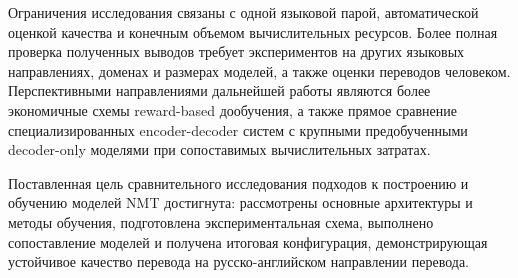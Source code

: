 Ограничения исследования связаны с одной языковой парой, автоматической оценкой качества и конечным объемом вычислительных ресурсов. Более полная проверка полученных выводов требует экспериментов на других языковых направлениях, доменах и размерах моделей, а также оценки переводов человеком. Перспективными направлениями дальнейшей работы являются более экономичные схемы reward-based дообучения, а также прямое сравнение специализированных encoder-decoder систем с крупными предобученными decoder-only моделями при сопоставимых вычислительных затратах.

Поставленная цель сравнительного исследования подходов к построению и обучению моделей NMT достигнута: рассмотрены основные архитектуры и методы обучения, подготовлена экспериментальная схема, выполнено сопоставление моделей и получена итоговая конфигурация, демонстрирующая устойчивое качество перевода на русско-английском направлении перевода.
